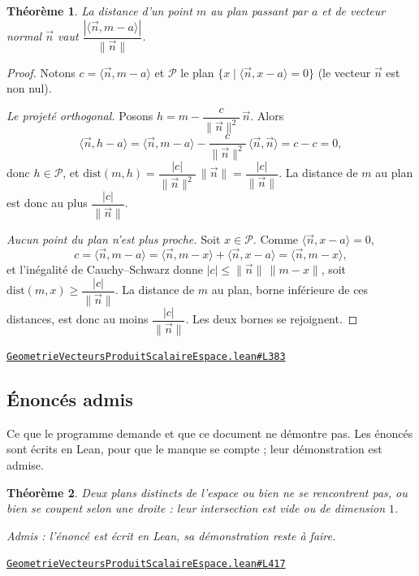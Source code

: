 \documentclass[11pt,a4paper]{article}
\theoremstyle{definition}
\theoremstyle{plain}
\newtheorem{theoreme}{Théorème}
\newcommand{\admis}{\par\smallskip\noindent\textit{Admis : l'énoncé est écrit en Lean, sa démonstration reste à faire.}\par}
\newcommand{\source}[2]{\par\smallskip\noindent\hfill{\footnotesize\href{#1}{\texttt{#2}}}\par\smallskip}
\begin{document}
\begin{theoreme}
La distance d'un point $m$ au plan passant par $a$ et de vecteur normal $\vec{n}$ vaut
$\dfrac{|\langle \vec{n}, m - a \rangle|}{\|\vec{n}\|}$.
\end{theoreme}
\begin{proof}
Notons $c = \langle \vec{n}, m - a \rangle$ et $\mathcal{P}$ le plan $\{x \mid \langle \vec{n}, x - a \rangle = 0\}$
(le vecteur $\vec{n}$ est non nul).

\emph{Le projeté orthogonal.} Posons $h = m - \dfrac{c}{\|\vec{n}\|^2}\,\vec{n}$. Alors
\[ \langle \vec{n}, h - a \rangle = \langle \vec{n}, m - a \rangle - \frac{c}{\|\vec{n}\|^2}\,\langle \vec{n}, \vec{n} \rangle = c - c = 0 , \]
donc $h \in \mathcal{P}$, et
$\mathrm{dist}(m, h) = \dfrac{|c|}{\|\vec{n}\|^2}\,\|\vec{n}\| = \dfrac{|c|}{\|\vec{n}\|}$.
La distance de $m$ au plan est donc au plus $\dfrac{|c|}{\|\vec{n}\|}$.

\emph{Aucun point du plan n'est plus proche.} Soit $x \in \mathcal{P}$. Comme
$\langle \vec{n}, x - a \rangle = 0$,
\[ c = \langle \vec{n}, m - a \rangle = \langle \vec{n}, m - x \rangle + \langle \vec{n}, x - a \rangle = \langle \vec{n}, m - x \rangle , \]
et l'inégalité de Cauchy--Schwarz donne $|c| \le \|\vec{n}\|\,\|m - x\|$, soit
$\mathrm{dist}(m, x) \ge \dfrac{|c|}{\|\vec{n}\|}$. La distance de $m$ au plan, borne inférieure
de ces distances, est donc au moins $\dfrac{|c|}{\|\vec{n}\|}$. Les deux bornes se rejoignent.
\end{proof}
\source{https://github.com/Commutator-IO/learn-lean/blob/main/courses/02-lycee/08-geometrie-vecteurs-produit-scalaire-espace/GeometrieVecteursProduitScalaireEspace.lean\#L383}{GeometrieVecteursProduitScalaireEspace.lean\#L383}

\vfill
\subsection{Énoncés admis}

\noindent
Ce que le programme demande et que ce document ne démontre pas. Les énoncés sont écrits en Lean, pour que le manque se compte ; leur démonstration est admise.

\begin{theoreme}
Deux plans distincts de l'espace ou bien ne se rencontrent pas, ou bien se coupent selon
une droite : leur intersection est vide ou de dimension $1$.
\end{theoreme}
\admis
\source{https://github.com/Commutator-IO/learn-lean/blob/main/courses/02-lycee/08-geometrie-vecteurs-produit-scalaire-espace/GeometrieVecteursProduitScalaireEspace.lean\#L417}{GeometrieVecteursProduitScalaireEspace.lean\#L417}
\end{document}
